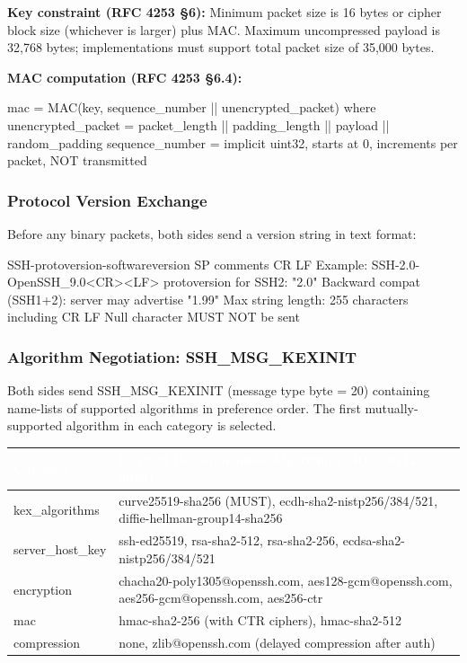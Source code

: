\documentclass[11pt,letterpaper]{article}
\newcommand{\tableheader}[1]{\textbf{\sffamily\textcolor{white}{#1}}}
\begin{document}
\textbf{Key constraint (RFC 4253 \S6):} Minimum packet size is 16 bytes or cipher block size (whichever is larger) plus MAC. Maximum uncompressed payload is 32,768 bytes; implementations must support total packet size of 35,000 bytes.

\textbf{MAC computation (RFC 4253 \S6.4):}
\begin{asciibox}
mac = MAC(key, sequence_number || unencrypted_packet)
  where unencrypted_packet = packet_length || padding_length || payload || random_padding
  sequence_number = implicit uint32, starts at 0, increments per packet, NOT transmitted
\end{asciibox}

\subsubsection{Protocol Version Exchange}

Before any binary packets, both sides send a version string in text format:
\begin{asciibox}
SSH-protoversion-softwareversion SP comments CR LF
  Example: SSH-2.0-OpenSSH_9.0<CR><LF>
  protoversion for SSH2: "2.0"
  Backward compat (SSH1+2): server may advertise "1.99"
  Max string length: 255 characters including CR LF
  Null character MUST NOT be sent
\end{asciibox}

\subsubsection{Algorithm Negotiation: SSH\_MSG\_KEXINIT}

Both sides send SSH\_MSG\_KEXINIT (message type byte = 20) containing name-lists of supported algorithms in preference order. The first mutually-supported algorithm in each category is selected.

\begin{center}
\begin{tabularx}{\textwidth}{L{5cm}X}
\toprule
{}
\tableheader{Category} & \tableheader{Current Recommended Algorithms (RFC 9142, 2022)} \\
\midrule
kex\_algorithms & curve25519-sha256 (MUST), ecdh-sha2-nistp256/384/521, diffie-hellman-group14-sha256 \\
server\_host\_key & ssh-ed25519, rsa-sha2-512, rsa-sha2-256, ecdsa-sha2-nistp256/384/521 \\
encryption & chacha20-poly1305@openssh.com, aes128-gcm@openssh.com, aes256-gcm@openssh.com, aes256-ctr \\
mac & hmac-sha2-256 (with CTR ciphers), hmac-sha2-512 \\
compression & none, zlib@openssh.com (delayed compression after auth) \\
\bottomrule
\end{tabularx}
\end{center}
\end{document}
